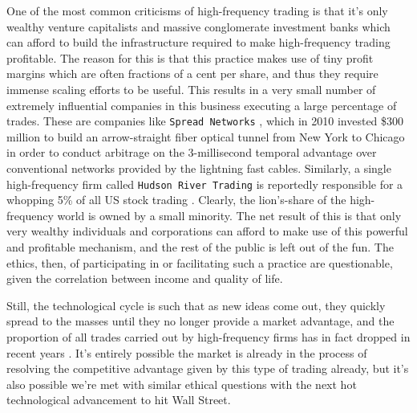 \documentclass[12pt,oneside,reqno]{amsart}
\theoremstyle{plain}
\theoremstyle{definition}
\theoremstyle{remark}
\newcommand{\inlinecode}{\texttt}
\begin{document}
One of the most common criticisms of high-frequency trading is that it's only wealthy venture capitalists and massive conglomerate investment banks which can afford to build the infrastructure required to make high-frequency trading profitable. The reason for this is that this practice makes use of tiny profit margins which are often fractions of a cent per share, and thus they require immense scaling efforts to be useful. This results in a very small number of extremely influential companies in this business executing a large percentage of trades. These are companies like \inlinecode{Spread Networks} \cite{o'brien_2014}, which in 2010 invested \$300 million to build an arrow-straight fiber optical tunnel from New York to Chicago in order to conduct arbitrage on the 3-millisecond temporal advantage over conventional networks provided by the lightning fast cables. Similarly, a single high-frequency firm called \inlinecode{Hudson River Trading} is reportedly responsible for a whopping 5\% of all US stock trading \cite{o'brien_2014}. Clearly, the lion's-share of the high-frequency world is owned by a small minority. The net result of this is that only very wealthy individuals and corporations can afford to make use of this powerful and profitable mechanism, and the rest of the public is left out of the fun. The ethics, then, of participating in or facilitating such a practice are questionable, given the correlation between income and quality of life. 

Still, the technological cycle is such that as new ideas come out, they quickly spread to the masses until they no longer provide a market advantage, and the proportion of all trades carried out by high-frequency firms has in fact dropped in recent years \cite{worstall_2017}. It's entirely possible the market is already in the process of resolving the competitive advantage given by this type of trading already, but it's also possible we're met with similar ethical questions with the next hot technological advancement to hit Wall Street. 














{}

\end{document}
